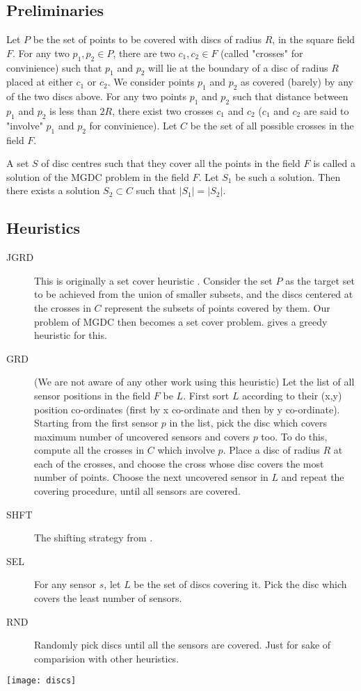 \subsection{Preliminaries}

Let $P$ be the set of points to be covered with discs of radius $R$, in the square field $F$. For any two $p_1, p_2 \in P$, there are two $c_1,c_2 \in F$ (called "crosses" for convinience) such that $p_1$ and $p_2$ will lie at the boundary of a disc of radius $R$ placed at either $c_1$ or $c_2$. We consider points $p_1$ and $p_2$ as covered (barely) by any of the two discs above. For any two points $p_1$ and $p_2$ such that distance between $p_1$ and $p_2$ is less than $2R$, there exist two crosses $c_1$ and $c_2$ ($c_1$ and $c_2$ are said to "involve" $p_1$ and $p_2$ for convinience). Let $C$ be the set of all possible crosses in the field $F$.

A set $S$ of disc centres such that they cover all the points in the field $F$ is called a solution of the MGDC problem in the field $F$. Let $S_1$ be such a solution. Then there exists a solution $S_2 \subset C$ such that $|S_1|=|S_2|$.

\subsection{Heuristics}

\begin{description}

\item[JGRD] This is originally a set cover heuristic \cite{jgreedy}. Consider the set $P$ as the target set to be achieved from the union of smaller subsets, and the discs centered at the crosses in $C$ represent the subsets of points covered by them. Our problem of MGDC then becomes a set cover problem. \cite{jgreedy} gives a greedy heuristic for this.

\item[GRD] (We are not aware of any other work using this heuristic) Let the list of all sensor positions in the field $F$ be $L$. First sort $L$ according to their (x,y) position co-ordinates (first by x co-ordinate and then by y co-ordinate). Starting from the first sensor $p$ in the list, pick the disc which covers maximum number of uncovered sensors and covers $p$ too. To do this, compute all the crosses in $C$ which involve $p$. Place a disc of radius $R$ at each of the crosses, and choose the cross whose disc covers the most number of points. Choose the next uncovered sensor in $L$ and repeat the covering procedure, until all sensors are covered.

\item[SHFT] The shifting strategy from \cite{shifting}.
\item[SEL] For any sensor $s$, let $L$ be the set of discs covering it. Pick the disc which covers the least number of sensors.
\item[RND] Randomly pick discs until all the sensors are covered. Just for sake of comparision with other heuristics.
\end{description}

\texttt{[image: discs]}